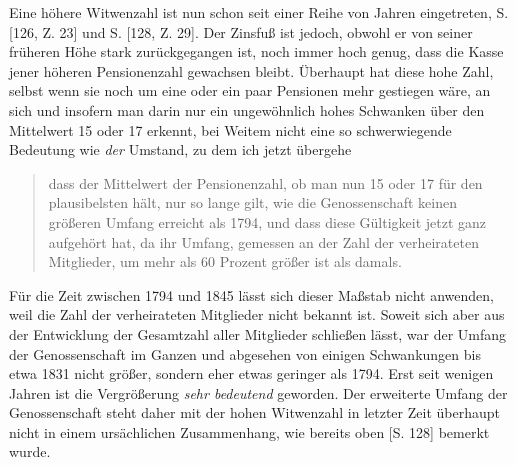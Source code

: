Eine höhere Witwenzahl ist nun schon seit einer Reihe von Jahren eingetreten, S. [126, Z. 23] und
S. [128, Z. 29]. Der Zinsfuß ist jedoch, obwohl er von seiner früheren Höhe stark zurückgegangen ist, noch immer hoch genug, dass die Kasse jener höheren Pensionenzahl gewachsen bleibt. Überhaupt hat diese hohe Zahl, selbst wenn sie noch um eine oder ein paar Pensionen mehr gestiegen wäre, an sich und insofern man darin nur ein ungewöhnlich hohes Schwanken über den Mittelwert 15 oder 17 erkennt, bei Weitem nicht eine so schwerwiegende Bedeutung wie \textit{der} Umstand, zu dem ich jetzt übergehe
\begin{quote}
dass der Mittelwert der Pensionenzahl, ob man nun 15 oder 17 für den plausibelsten hält, nur so lange gilt, wie die Genossenschaft keinen größeren Umfang erreicht als 1794, und dass diese Gültigkeit jetzt ganz aufgehört hat, da ihr Umfang, gemessen an der Zahl der verheirateten Mitglieder, um mehr als 60 Prozent größer ist als damals.
\end{quote}
\noindent\hspace*{\parindent}Für die Zeit zwischen 1794 und 1845 lässt sich dieser Maßstab nicht anwenden, weil die Zahl der verheirateten Mitglieder nicht bekannt ist. Soweit sich aber aus der Entwicklung der Gesamtzahl aller Mitglieder schließen lässt, war der Umfang der Genossenschaft im Ganzen und abgesehen von einigen Schwankungen bis etwa 1831 nicht größer, sondern eher etwas geringer als 1794. Erst seit wenigen Jahren ist die Vergrößerung \textit{sehr bedeutend} geworden. Der erweiterte Umfang der Genossenschaft steht daher mit der hohen Witwenzahl in letzter Zeit überhaupt nicht in einem ursächlichen Zusammenhang, wie bereits oben [S. 128] bemerkt wurde.

